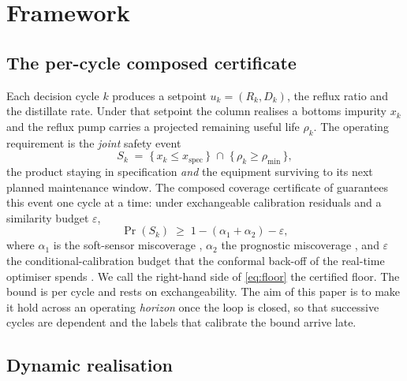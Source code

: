 \documentclass[review,12pt]{elsarticle}
\begin{document}
\section{Framework}
\label{sec:framework}

\subsection{The per-cycle composed certificate}
\label{sec:percycle}

Each decision cycle $k$ produces a setpoint $u_k=(R_k,D_k)$, the reflux ratio and the
distillate rate. Under that setpoint the column realises a bottoms impurity $x_k$ and the
reflux pump carries a projected remaining useful life $\rho_k$. The operating requirement is
the \emph{joint} safety event
\begin{equation}
  S_k \;=\; \{\, x_k \le x_{\mathrm{spec}} \,\}\;\cap\;\{\, \rho_k \ge \rho_{\min} \,\},
  \label{eq:Sk}
\end{equation}
the product staying in specification \emph{and} the equipment surviving to its next planned
maintenance window. The composed coverage certificate of \citet{busico_m4} guarantees this
event one cycle at a time: under exchangeable calibration residuals and a similarity budget
$\varepsilon$,
\begin{equation}
  \Pr(S_k) \;\ge\; 1-(\alpha_1+\alpha_2)-\varepsilon,
  \label{eq:floor}
\end{equation}
where $\alpha_1$ is the soft-sensor miscoverage \citep{busico_m1}, $\alpha_2$ the prognostic
miscoverage \citep{busico_m2}, and $\varepsilon$ the conditional-calibration budget that the
conformal back-off of the real-time optimiser spends \citep{busico_m3}. We call the
right-hand side of \eqref{eq:floor} the certified floor. The bound is per cycle and rests on
exchangeability. The aim of this paper is to make it hold across an operating \emph{horizon}
once the loop is closed, so that successive cycles are dependent and the labels that calibrate
the bound arrive late.

\subsection{Dynamic realisation}
\label{sec:dynamic}
\end{document}
